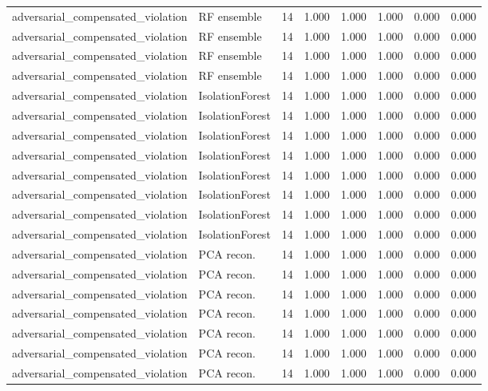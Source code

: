 {\begin{longtable}{llrrrrrr}
adversarial\_compensated\_violation & RF ensemble & 14 & 1.000 & 1.000 & 1.000 & 0.000 & 0.000 \\
adversarial\_compensated\_violation & RF ensemble & 14 & 1.000 & 1.000 & 1.000 & 0.000 & 0.000 \\
adversarial\_compensated\_violation & RF ensemble & 14 & 1.000 & 1.000 & 1.000 & 0.000 & 0.000 \\
adversarial\_compensated\_violation & RF ensemble & 14 & 1.000 & 1.000 & 1.000 & 0.000 & 0.000 \\
adversarial\_compensated\_violation & IsolationForest & 14 & 1.000 & 1.000 & 1.000 & 0.000 & 0.000 \\
adversarial\_compensated\_violation & IsolationForest & 14 & 1.000 & 1.000 & 1.000 & 0.000 & 0.000 \\
adversarial\_compensated\_violation & IsolationForest & 14 & 1.000 & 1.000 & 1.000 & 0.000 & 0.000 \\
adversarial\_compensated\_violation & IsolationForest & 14 & 1.000 & 1.000 & 1.000 & 0.000 & 0.000 \\
adversarial\_compensated\_violation & IsolationForest & 14 & 1.000 & 1.000 & 1.000 & 0.000 & 0.000 \\
adversarial\_compensated\_violation & IsolationForest & 14 & 1.000 & 1.000 & 1.000 & 0.000 & 0.000 \\
adversarial\_compensated\_violation & IsolationForest & 14 & 1.000 & 1.000 & 1.000 & 0.000 & 0.000 \\
adversarial\_compensated\_violation & IsolationForest & 14 & 1.000 & 1.000 & 1.000 & 0.000 & 0.000 \\
adversarial\_compensated\_violation & PCA recon. & 14 & 1.000 & 1.000 & 1.000 & 0.000 & 0.000 \\
adversarial\_compensated\_violation & PCA recon. & 14 & 1.000 & 1.000 & 1.000 & 0.000 & 0.000 \\
adversarial\_compensated\_violation & PCA recon. & 14 & 1.000 & 1.000 & 1.000 & 0.000 & 0.000 \\
adversarial\_compensated\_violation & PCA recon. & 14 & 1.000 & 1.000 & 1.000 & 0.000 & 0.000 \\
adversarial\_compensated\_violation & PCA recon. & 14 & 1.000 & 1.000 & 1.000 & 0.000 & 0.000 \\
adversarial\_compensated\_violation & PCA recon. & 14 & 1.000 & 1.000 & 1.000 & 0.000 & 0.000 \\
adversarial\_compensated\_violation & PCA recon. & 14 & 1.000 & 1.000 & 1.000 & 0.000 & 0.000 \\

\end{longtable}}
